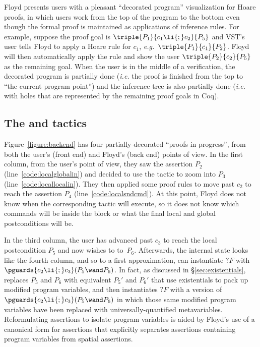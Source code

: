 Floyd presents users with a pleasant ``decorated program'' visualization for Hoare proofs, in which users work from the top of the program to the bottom even though the formal proof is maintained as applications of inference rules.  For example, suppose the proof goal is $\triple{P_1}{c_1\li{;}c_2}{P_5}$ and VST's user tells Floyd to apply a Hoare rule for $c_1$, \emph{e.g.}~$\triple{P_1}{c_1}{P_2}$.  Floyd will then automatically apply the  rule and show the user $\triple{P_2}{c_2}{P_5}$ as the remaining goal.
When the user is in the middle of a verification, the decorated program is partially done (\emph{i.e.} the proof is finished from the top to ``the current program point'') and the inference tree is also partially done (\emph{i.e.} with holes that are represented by the remaining proof goals in Coq).

\subsection{The  and  tactics}



Figure~\ref{figure:backend} has four partially-decorated ``proofs in progress'', from both the user's (front end) and Floyd's (back end) points of view.  In the first column, from the user's point of view, they saw the assertion $P_2$ (line~\ref{code:localglobalin}) and decided to use the  tactic to zoom into $P_3$ (line~\ref{code:locallocalin}).  They then applied some proof rules to move past $c_2$ to reach the assertion $P_4$ (line~\ref{code:localsndcmd}).  At this point, Floyd does not know when the corresponding  tactic will execute, so it does not know which commands will be inside the block or what the final local and global postconditions will be.

In the third column, the user has advanced past $c_3$ to reach the local postcondition $P_5$ and now wishes to  to~$P_6$.  Afterwards, the internal state looks like the fourth column, and so to a first approximation,  can instantiate $?F$ with $\pguards{c_2\li{;} c_3}(P_5 \wand P_6)$.  In fact, as discussed in \S\ref{sec:existentials},  replaces $P_5$ and $P_6$ with equivalent $P_5'$ and $P_6'$ that use existentials to pack up modified program variables, and then instantiates $?F$ with a version of $\pguards{c_2\li{;} c_3}(P_5 \wand P_6)$ in which those same modified program variables have been replaced with universally-quantified metavariables.  Reformulating assertions to isolate program variables is aided by Floyd's use of a canonical form for assertions that explicitly separates assertions containing program variables from spatial assertions.

